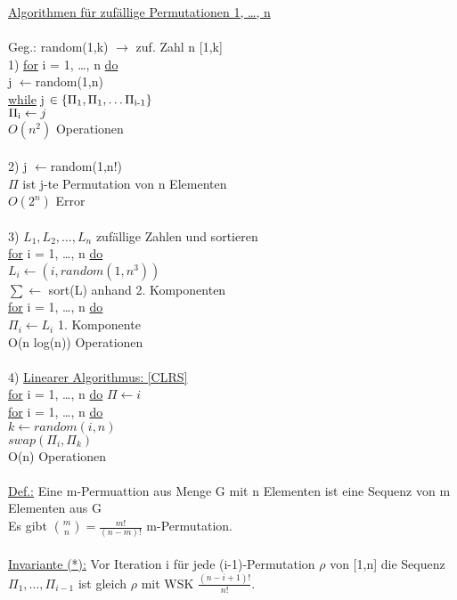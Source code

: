 \documentclass{article}
\begin{document}
	\newpage
	\underline{Algorithmen für zufällige Permutationen 1, \ldots , n} \\
	\\
	Geg.: random(1,k) $\rightarrow$ zuf. Zahl n [1,k] \\
	1) \underline{for} i = 1, \ldots , n \underline{do} \\
	j $\leftarrow$random(1,n) \\
	\underline{while} j $\in \{\Pi\textsubscript{1},\Pi\textsubscript{1}, \ldots \Pi\textsubscript{i-1}\}$ \\
	$\Pi\textsubscript{i} \leftarrow j$ \\
	$O(n^2)$ Operationen \\
	\\
	2) j $\leftarrow$random(1,n!) \\
	$\Pi$ ist j-te Permutation von n Elementen \\
	$O(2^n)$ Error \\
	\\
	3) $L_1, L_2, \ldots , L_n$ zufällige Zahlen und sortieren \\
	\underline{for} i = 1, \ldots , n \underline{do} \\
	$L_i \leftarrow(i, random(1,n^3))$ \\
	$\sum \leftarrow$ sort(L) anhand 2. Komponenten \\
	\underline{for} i = 1, \ldots , n \underline{do} \\
	$\Pi_i \leftarrow L_i$ 1. Komponente \\
	O(n log(n)) Operationen \\
	\\
	4) \underline{Linearer Algorithmus: [CLRS]} \\
	\underline{for} i = 1, \ldots , n \underline{do} $\Pi \leftarrow i$ \\
	\underline{for} i = 1, \ldots , n \underline{do} \\
	$k \leftarrow random(i,n)$ \\
	$swap(\Pi_i, \Pi_k)$ \\
	O(n) Operationen \\
	\\
	\underline{Def.:} Eine m-Permuattion aus Menge G mit n  Elementen ist eine Sequenz von m Elementen aus G \\
	Es gibt $\binom{m}{n} = \frac{m!}{(n-m)!}$ m-Permutation. \\
	\\
	\underline{Invariante (*):} Vor Iteration i für jede (i-1)-Permutation $\rho$ von [1,n] die Sequenz $\Pi_1, \ldots , \Pi_{i-1}$ ist gleich $\rho$ mit WSK $\frac{(n-i+1)!}{n!}$. \\
\end{document}
